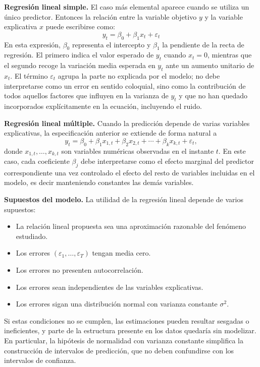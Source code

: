 \documentclass[12pt]{report} %
\begin{document}
\textbf{Regresión lineal simple.} El caso más elemental aparece cuando se utiliza un único predictor. Entonces la relación entre la variable objetivo $y$ y la variable explicativa $x$ puede escribirse como:
$$
    y_t = \beta_0 + \beta_1 x_t + \varepsilon_t
$$
En esta expresión, $\beta_0$ representa el intercepto y $\beta_1$ la pendiente de la recta de regresión. El primero indica el valor esperado de $y_t$ cuando $x_t = 0$, mientras que el segundo recoge la variación media esperada en $y_t$ ante un aumento unitario de $x_t$. El término $\varepsilon_t$ agrupa la parte no explicada por el modelo; no debe interpretarse como un error en sentido coloquial, sino como la contribución de todos aquellos factores que influyen en la varianza de $y_t$ y que no han quedado incorporados explícitamente en la ecuación, incluyendo el ruido.

\textbf{Regresión lineal múltiple.} Cuando la predicción depende de varias variables explicativas, la especificación anterior se extiende de forma natural a
\begin{equation}
    y_t = \beta_0 + \beta_1 x_{1,t} + \beta_2 x_{2,t} + \cdots + \beta_k x_{k,t} + \varepsilon_t,
    \label{eq:multiple_linear_regression}
\end{equation}
donde $x_{1,t}, \ldots, x_{k,t}$ son variables numéricas observadas en el instante $t$. En este caso, cada coeficiente $\beta_j$ debe interpretarse como el efecto marginal del predictor correspondiente una vez controlado el efecto del resto de variables incluidas en el modelo, es decir manteniendo constantes las demás variables.

\textbf{Supuestos del modelo.} La utilidad de la regresión lineal depende de varios supuestos:
\begin{itemize}
    \item La relación lineal propuesta sea una aproximación razonable del fenómeno estudiado.
    \item Los errores $(\varepsilon_1, \ldots, \varepsilon_T)$ tengan media cero.
    \item Los errores no presenten autocorrelación.
    \item Los errores sean independientes de las variables explicativas.
    \item Los errores sigan una distribución normal con varianza constante $\sigma^2$.
\end{itemize}

Si estas condiciones no se cumplen, las estimaciones pueden resultar sesgadas o ineficientes, y parte de la estructura presente en los datos quedaría sin modelizar. En particular, la hipótesis de normalidad con varianza constante simplifica la construcción de intervalos de predicción, que no deben confundirse con los intervalos de confianza.
\end{document}
